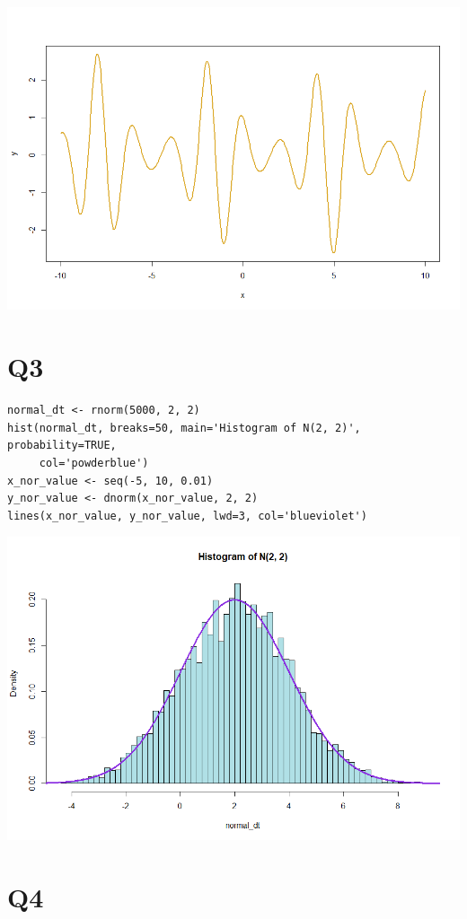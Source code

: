\documentclass[12pt,letterpaper]{article}
\begin{document}
\includegraphics[width=150mm]{x-y_relation.png}

\newpage

\section*{Q3}

\begin{verbatim}
normal_dt <- rnorm(5000, 2, 2)
hist(normal_dt, breaks=50, main='Histogram of N(2, 2)', probability=TRUE, 
     col='powderblue')
x_nor_value <- seq(-5, 10, 0.01)
y_nor_value <- dnorm(x_nor_value, 2, 2)
lines(x_nor_value, y_nor_value, lwd=3, col='blueviolet')
\end{verbatim}

\includegraphics[width=150mm]{hist_norm.png}

\newpage

\section*{Q4}
\end{document}
